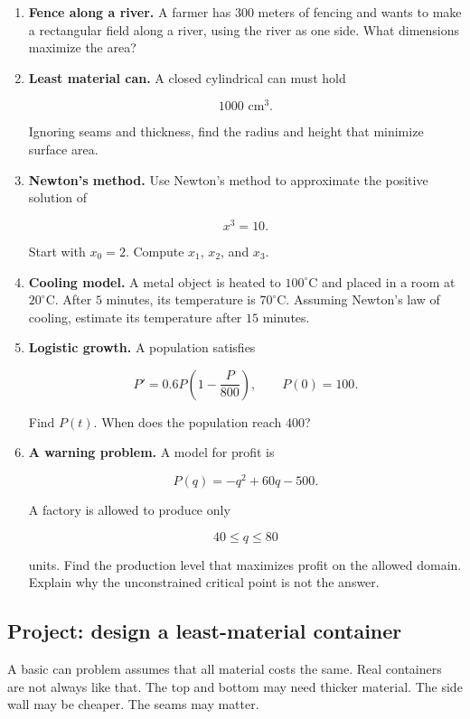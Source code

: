 \begin{enumerate}
\item \textbf{Fence along a river.}
A farmer has \(300\) meters of fencing and wants to make a rectangular field along
a river, using the river as one side.  What dimensions maximize the area?

\item \textbf{Least material can.}
A closed cylindrical can must hold

\[
1000\text{ cm}^3.
\]

Ignoring seams and thickness, find the radius and height that minimize surface area.

\item \textbf{Newton's method.}
Use Newton's method to approximate the positive solution of

\[
x^3=10.
\]

Start with \(x_0=2\).  Compute \(x_1\), \(x_2\), and \(x_3\).

\item \textbf{Cooling model.}
A metal object is heated to \(100^\circ\text{C}\) and placed in a room at
\(20^\circ\text{C}\).  After \(5\) minutes, its temperature is \(70^\circ\text{C}\).
Assuming Newton's law of cooling, estimate its temperature after \(15\) minutes.

\item \textbf{Logistic growth.}
A population satisfies

\[
P'=0.6P\left(1-\frac{P}{800}\right),
\qquad
P(0)=100.
\]

Find \(P(t)\).  When does the population reach \(400\)?

\item \textbf{A warning problem.}
A model for profit is

\[
P(q)=-q^2+60q-500.
\]

A factory is allowed to produce only

\[
40\le q\le 80
\]

units.  Find the production level that maximizes profit on the allowed domain.
Explain why the unconstrained critical point is not the answer.
\end{enumerate}

\subsection{Project: design a least-material container}
\label{subsec:project-least-material-container}

A basic can problem assumes that all material costs the same.  Real containers are
not always like that.  The top and bottom may need thicker material.  The side wall
may be cheaper.  The seams may matter.

